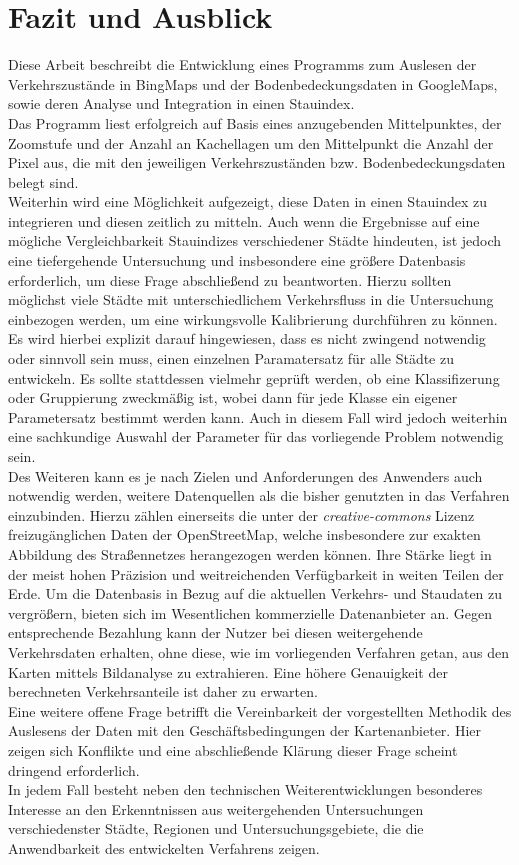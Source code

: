 \section{Fazit und Ausblick}

Diese Arbeit beschreibt die Entwicklung eines Programms zum Auslesen der Verkehrszustände in BingMaps und der Bodenbedeckungsdaten in GoogleMaps, sowie deren Analyse und Integration in einen Stauindex.\\
Das Programm liest erfolgreich auf Basis eines anzugebenden Mittelpunktes, der Zoomstufe und der Anzahl an Kachellagen um den Mittelpunkt die Anzahl der Pixel aus, die mit den jeweiligen Verkehrszuständen bzw. Bodenbedeckungsdaten belegt sind.\\
Weiterhin wird eine Möglichkeit aufgezeigt, diese Daten in einen Stauindex zu integrieren und diesen zeitlich zu mitteln. Auch wenn die Ergebnisse auf eine mögliche Vergleichbarkeit Stauindizes verschiedener Städte hindeuten, ist jedoch eine tiefergehende Untersuchung und insbesondere eine größere Datenbasis erforderlich, um diese Frage abschließend zu beantworten. Hierzu sollten möglichst viele Städte mit unterschiedlichem Verkehrsfluss in die Untersuchung einbezogen werden, um eine wirkungsvolle Kalibrierung durchführen zu können. Es wird hierbei explizit darauf hingewiesen, dass es nicht zwingend notwendig oder sinnvoll sein muss, einen einzelnen Paramatersatz für alle Städte zu entwickeln. Es sollte stattdessen vielmehr geprüft werden, ob eine Klassifizerung oder Gruppierung zweckmäßig ist, wobei dann für jede Klasse ein eigener Parametersatz bestimmt werden kann. Auch in diesem Fall wird jedoch weiterhin eine sachkundige Auswahl der Parameter für das vorliegende Problem notwendig sein.\\

Des Weiteren kann es je nach Zielen und Anforderungen des Anwenders auch notwendig werden, weitere Datenquellen als die bisher genutzten in das Verfahren einzubinden. Hierzu zählen einerseits die unter der \textit{creative-commons} Lizenz freizugänglichen Daten der OpenStreetMap, welche insbesondere zur exakten Abbildung des Straßennetzes herangezogen werden können. Ihre Stärke liegt in der meist hohen Präzision und weitreichenden Verfügbarkeit in weiten Teilen der Erde. Um die Datenbasis in Bezug auf die aktuellen Verkehrs- und Staudaten zu vergrößern, bieten sich im Wesentlichen kommerzielle Datenanbieter an. Gegen entsprechende Bezahlung kann der Nutzer bei diesen weitergehende Verkehrsdaten erhalten, ohne diese, wie im vorliegenden Verfahren getan, aus den Karten mittels Bildanalyse zu extrahieren. Eine höhere Genauigkeit der berechneten Verkehrsanteile ist daher zu erwarten.\\
Eine weitere offene Frage betrifft die Vereinbarkeit der vorgestellten Methodik des Auslesens der Daten mit den Geschäftsbedingungen der Kartenanbieter. Hier zeigen sich Konflikte und eine abschließende Klärung dieser Frage scheint dringend erforderlich.\\

In jedem Fall besteht neben den technischen Weiterentwicklungen besonderes Interesse an den Erkenntnissen aus weitergehenden Untersuchungen verschiedenster Städte, Regionen und Untersuchungsgebiete, die die Anwendbarkeit des entwickelten Verfahrens zeigen.
